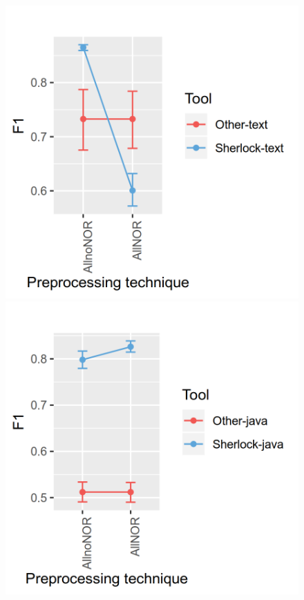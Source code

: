 \documentclass[a4paper, 12pt, oneside, openany, final, pdftex]{book}\usepackage[]{graphicx}\usepackage[]{color}
\makeatletter
\def\maxwidth{ %
  \ifdim\Gin@nat@width>\linewidth
    \linewidth
  \else
    \Gin@nat@width
  \fi
}
\makeatother
\begin{document}
\begin{appendices}
\begin{figure}[ht]
\label{fig:interaction- 16 for SOCO D1 }\endminipage\hfill {} 
\includegraphics[width=\maxwidth]{figure/Figure-SOCO-INTERACTION-17} 
\label{fig:interaction- 17 for SOCO D1 }\endminipage\hfill {} 
\includegraphics[width=\maxwidth]{figure/Figure-SOCO-INTERACTION-18} 

\end{figure}
\end{appendices}
\end{document}

